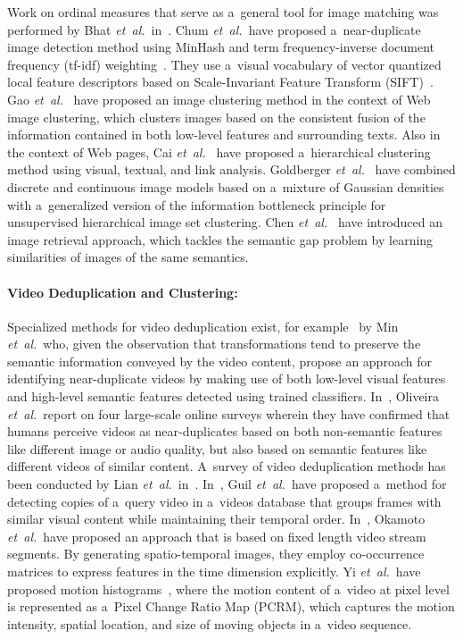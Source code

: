 Work on ordinal measures that serve as a~general tool for
image matching was performed by Bhat \emph{et~al.}\
in~\cite{bhat1998imagecorrespondence}.
Chum \emph{et~al.}\ have proposed a~near-duplicate image detection method
using MinHash and term frequency-inverse document frequency (tf-idf)
weighting~\cite{chum2008nearduplicate}.
They use a~visual vocabulary of vector quantized local feature descriptors based on
Scale-Invariant Feature Transform (SIFT)~\cite{lowe1999sift}.
Gao \emph{et~al.}\ \cite{gao2005webimageclustering} have proposed an image clustering method
in the context of Web image clustering, which clusters images
based on the consistent fusion of the information contained in
both low-level features and surrounding texts.
Also in the context of Web pages, Cai
\emph{et~al.}\ \cite{cai2004hierarchicalclustering} have proposed
a~hierarchical clustering method using visual, textual, and link analysis.
Goldberger \emph{et~al.}\ \cite{goldberger2006unsupervisedclustering}
have combined discrete and continuous image models based on a~mixture of Gaussian densities
with a~generalized version of the information bottleneck principle
for unsupervised hierarchical image set clustering.
Chen \emph{et~al.}\ \cite{chen2003cbir} have introduced an image retrieval approach,
which tackles the semantic gap problem by learning similarities
of images of the same semantics.

\paragraph{Video Deduplication and Clustering:}

Specialized methods for video deduplication exist,
for example~\cite{min2011nearduplicatevideo,wu2009nearduplicate}
by Min \emph{et~al.}\ who, given the observation that
transformations tend to preserve the semantic information conveyed
by the video content, propose an approach for identifying
near-duplicate videos by making use of both low-level visual
features and high-level semantic features
detected using trained classifiers.
In~\cite{oliveira2010nearduplicate}, Oliveira
\emph{et~al.}\ report on four large-scale online surveys
wherein they have confirmed that humans perceive videos as near-duplicates
based on both non-semantic features like different image or audio
quality, but also based on semantic features like different
videos of similar content.
A~survey of video deduplication methods has been conducted by
Lian \emph{et~al.}\ in~\cite{lian2010survey}.
In~\cite{guil2007clustering}, Guil \emph{et~al.}\ have proposed a~method
for detecting copies of a~query video in a~videos database
that groups frames with similar visual content while maintaining their temporal order.
In~\cite{okamoto2002videoclustering}, Okamoto \emph{et~al.}\  have proposed an approach
that is based on fixed length video stream segments.
By generating spatio-temporal images, they employ co-occurrence matrices
to express features in the time dimension explicitly.
Yi \emph{et~al.}\ have proposed motion histograms~\cite{yi2005motionhistogram},
where the motion content of a~video at pixel level is represented
as a~Pixel Change Ratio Map (PCRM), which captures the motion intensity,
spatial location, and size of moving objects in a~video sequence.

